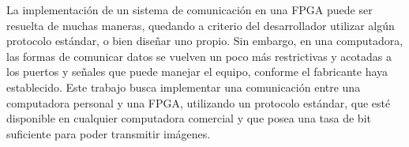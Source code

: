 %
%

La implementación de un sistema de comunicación en una FPGA puede ser resuelta de muchas maneras, quedando a criterio del desarrollador utilizar algún protocolo estándar, o bien diseñar uno propio. Sin embargo, en una computadora, las formas de comunicar datos se vuelven un poco más restrictivas y acotadas a los puertos y señales que puede manejar el equipo, conforme el fabricante haya establecido.
Este trabajo busca implementar una comunicación entre una computadora personal y una FPGA, utilizando un protocolo estándar, que esté disponible en cualquier computadora comercial y que posea una tasa de bit suficiente para poder transmitir imágenes.


